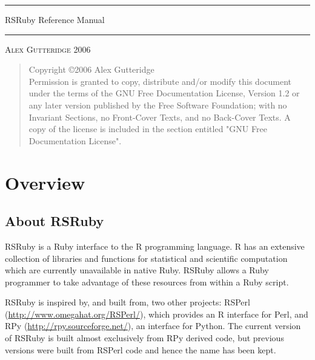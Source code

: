 \documentclass[a4paper,12pt]{book}
\newcommand\HRule{\noindent\rule{\linewidth}{1.5pt}}
\begin{document}


\begin{titlepage}
\HRule
\begin{flushright}
\LARGE RSRuby Reference Manual
\end{flushright}
\HRule
{}
\begin{center}
\textsc{Alex Gutteridge 2006}
\end{center}
\end{titlepage}

\begin{quote}
Copyright \copyright  2006 Alex Gutteridge \\
Permission is granted to copy, distribute and/or modify this document under the terms of the GNU Free Documentation License, Version 1.2 or any later version published by the Free Software Foundation; with no Invariant Sections, no Front-Cover Texts, and no Back-Cover Texts. A copy of the license is included in the section entitled "GNU Free Documentation License".
\end{quote}

\tableofcontents

\chapter{Overview}

\section{About RSRuby}

RSRuby is a Ruby interface to the R programming language. R has an extensive collection of libraries and functions for statistical and scientific computation which are currently unavailable in native Ruby. RSRuby allows a Ruby programmer to take advantage of these resources from within a Ruby script.

RSRuby is inspired by, and built from, two other projects: RSPerl (\url{http://www.omegahat.org/RSPerl/}), which provides an R interface for Perl, and RPy (\url{http://rpy.sourceforge.net/}), an interface for Python. The current version of RSRuby is built almost exclusively from RPy derived code, but previous versions were built from RSPerl code and hence the name has been kept.
\end{document}
